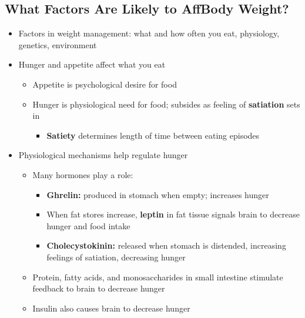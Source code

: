 \documentclass[12pt]{article}
\begin{document}
        \subsection{What Factors Are Likely to AffBody Weight?}
            \begin{itemize}
                \item Factors in weight management: what and how often you eat, physiology, genetics, environment
                \item Hunger and appetite affect what you eat
                    \begin{itemize}
                        \item Appetite is psychological desire for food
                        \item Hunger is physiological need for food; subsides as feeling of \textbf{satiation} sets in
                            \begin{itemize}
                                \item \textbf{Satiety} determines length of time between eating episodes
                            \end{itemize}
                    \end{itemize}
                \item Physiological mechanisms help regulate hunger
                    \begin{itemize}
                        \item Many hormones play a role:
                            \begin{itemize}
                                \item \textbf{Ghrelin:} produced in stomach when empty; increases hunger
                                \item When fat stores increase, \textbf{leptin} in fat tissue signals brain to decrease hunger and food intake
                                \item \textbf{Cholecystokinin:} released when stomach is distended, increasing feelings of satiation, decreasing hunger
                            \end{itemize}
                        \item Protein, fatty acids, and monosaccharides in small intestine stimulate feedback to brain to decrease hunger
                        \item Insulin also causes brain to decrease hunger
                    \end{itemize}

\end{itemize}
\end{document}
